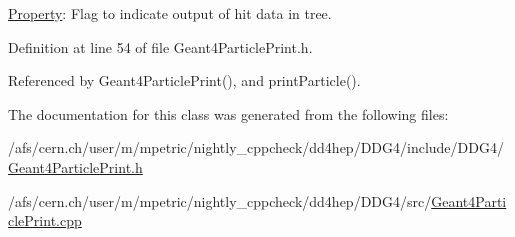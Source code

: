 \hyperlink{class_d_d4hep_1_1_property}{Property}\+: Flag to indicate output of hit data in tree. 



Definition at line 54 of file Geant4\+Particle\+Print.\+h.



Referenced by Geant4\+Particle\+Print(), and print\+Particle().



The documentation for this class was generated from the following files\+:\begin{DoxyCompactItemize}
\item 
/afs/cern.\+ch/user/m/mpetric/nightly\+\_\+cppcheck/dd4hep/\+D\+D\+G4/include/\+D\+D\+G4/\hyperlink{_geant4_particle_print_8h}{Geant4\+Particle\+Print.\+h}\item 
/afs/cern.\+ch/user/m/mpetric/nightly\+\_\+cppcheck/dd4hep/\+D\+D\+G4/src/\hyperlink{_geant4_particle_print_8cpp}{Geant4\+Particle\+Print.\+cpp}\end{DoxyCompactItemize}

